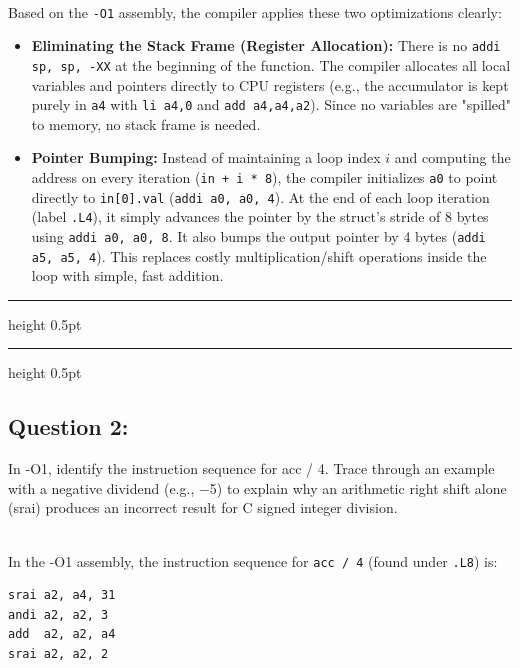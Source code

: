 \documentclass[12pt, a4paper]{article}
\begin{document}
\vspace{0.3cm}
\noindent{}\\
Based on the \texttt{-O1} assembly, the compiler applies these two optimizations clearly:
\begin{itemize}[leftmargin=*]
    \item \textbf{Eliminating the Stack Frame (Register Allocation):} There is no \texttt{addi sp, sp, -XX} at the beginning of the function. The compiler allocates all local variables and pointers directly to CPU registers (e.g., the accumulator is kept purely in \texttt{a4} with \texttt{li a4,0} and \texttt{add a4,a4,a2}). Since no variables are "spilled" to memory, no stack frame is needed.
    \item \textbf{Pointer Bumping:} Instead of maintaining a loop index $i$ and computing the address on every iteration (\texttt{in + i * 8}), the compiler initializes \texttt{a0} to point directly to \texttt{in[0].val} (\texttt{addi a0, a0, 4}). At the end of each loop iteration (label \texttt{.L4}), it simply advances the pointer by the struct's stride of 8 bytes using \texttt{addi a0, a0, 8}. It also bumps the output pointer by 4 bytes (\texttt{addi a5, a5, 4}). This replaces costly multiplication/shift operations inside the loop with simple, fast addition.
\end{itemize}

\vspace{5pt}
\hrule height 0.5pt
\vspace{2pt}
\hrule height 0.5pt
\vspace{5pt}

\subsection*{Question 2:}

\vspace{0.3cm}
In -O1, identify the instruction sequence for acc / 4. Trace through an example
with a negative dividend (e.g., −5) to explain why an arithmetic right shift alone
(srai) produces an incorrect result for C signed integer division.

\vspace{0.3cm}
\noindent{}\\
In the -O1 assembly, the instruction sequence for \texttt{acc / 4} (found under \texttt{.L8}) is:
\begin{verbatim}
srai a2, a4, 31
andi a2, a2, 3
add  a2, a2, a4
srai a2, a2, 2
\end{verbatim}
\end{document}
